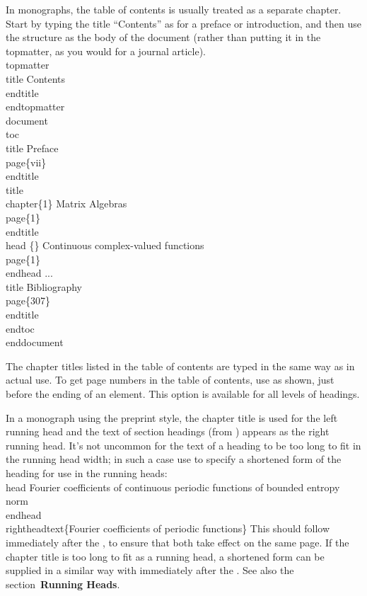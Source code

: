 In monographs, the table of contents is usually treated as a separate
chapter.  Start by typing the title ``Contents'' as for a preface or
introduction, and then use the  structure as the
body of the document (rather than putting it in the topmatter, as you
would for a journal article).
\beginexample{}
\\topmatter
\\title Contents\\endtitle
\\endtopmatter
\bigskip
\\document
\\toc
\\title Preface\\page\{vii\}\\endtitle
\\title\\chapter\{1\} Matrix Algebras\\page\{1\}\\endtitle
\\head \{\} Continuous complex-valued functions\\page\{1\}\\endhead
...
\\title Bibliography\\page\{307\}\\endtitle
\\endtoc
\\enddocument
\endexample

The chapter titles listed in the table of contents are typed in the same
way as in actual use.  To get page numbers in the table of contents, use
 as shown, just before the ending of an element.  This option
is available for all levels of headings.

In a monograph using the preprint style, the chapter title is used for
the left running head and the text of section headings
(from ) appears as the right running head.
It's not uncommon for the text of a heading to be too long to fit
in the running head width; in such a case use  to
specify a shortened form of the heading for use in the running heads:
\beginexample{}
\\head Fourier coefficients of continuous periodic functions
of bounded entropy norm\\endhead
\\rightheadtext\{Fourier coefficients of periodic functions\}
\endexample
\noindent This should follow immediately after the , to ensure
that both take effect on the same page.  If the chapter title is too long
to fit as a running head, a shortened form can be supplied in a similar
way with  immediately after the .
See also the section~{\bf Running Heads}.

